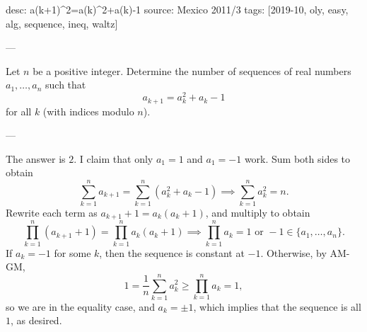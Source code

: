 desc: a(k+1)^2=a(k)^2+a(k)-1
source: Mexico 2011/3
tags: [2019-10, oly, easy, alg, sequence, ineq, waltz]

---

Let $n$ be a positive integer. Determine the number of sequences of real numbers $a_1,\ldots,a_n$ such that \[a_{k+1}=a_k^2+a_k-1\]
for all $k$ (with indices modulo $n$).

---

The answer is $2$. I claim that only $a_1=1$ and $a_1=-1$ work. Sum both sides to obtain \[\sum_{k=1}^na_{k+1}=\sum_{k=1}^n \left(a_k^2+a_k-1\right)\implies\sum_{k=1}^na_k^2=n.\]
Rewrite each term as $a_{k+1}+1=a_k(a_k+1)$, and multiply to obtain \[\prod_{k=1}^n (a_{k+1}+1)=\prod_{k=1}^na_k(a_k+1)\implies \prod_{k=1}^na_k=1\text{ or }-1\in\{a_1,\ldots,a_n\}.\]
If $a_k=-1$ for some $k$, then the sequence is constant at $-1$. Otherwise, by AM-GM, \[1=\frac1n\sum_{k=1}^na_k^2\ge\prod_{k=1}^na_k=1,\]
so we are in the equality case, and $a_k=\pm 1$, which implies that the sequence is all $1$, as desired.

